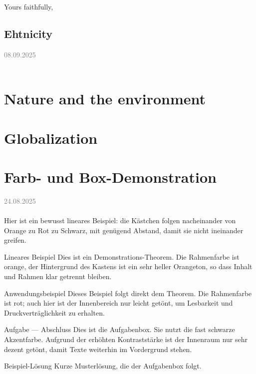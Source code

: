 \documentclass[11pt,a4paper,oneside]{article}
\newcommand{\lessondate}[1]{
	\noindent\hfill\textcolor{gray}{\textsc{#1}} \\
	\vspace{0.5cm}
}
\begin{document}
	Yours faithfully,
	\newpage
	
	\subsection{Ehtnicity}
	\lessondate{08.09.2025}\\
	
	
	\section{Nature and the environment}
	\section{Globalization}
	
	
	\newpage
	
	
	\section{Farb- und Box-Demonstration}

	
	\lessondate{24.08.2025}\\
	Hier ist ein bewusst lineares Beispiel: die Kästchen folgen nacheinander von Orange zu Rot zu Schwarz, mit genügend Abstand, damit sie nicht ineinander greifen.
	
	\begin{theorem}{Lineares Beispiel}
		Dies ist ein Demonstrations-Theorem. Die Rahmenfarbe ist orange, der Hintergrund des Kastens ist ein sehr heller Orangeton, so dass Inhalt und Rahmen klar getrennt bleiben.
	\end{theorem}
	
	\begin{example}{Anwendungsbeispiel}
		Dieses Beispiel folgt direkt dem Theorem. Die Rahmenfarbe ist rot; auch hier ist der Innenbereich nur leicht getönt, um Lesbarkeit und Druckverträglichkeit zu erhalten.
	\end{example}
	
	\begin{task}{Aufgabe — Abschluss}
		Dies ist die Aufgabenbox. Sie nutzt die fast schwarze Akzentfarbe. Aufgrund der erhöhten Kontraststärke ist der Innenraum nur sehr dezent getönt, damit Texte weiterhin im Vordergrund stehen.
	\end{task}
	
	\begin{solution}{Beispiel-Lösung}
		Kurze Musterlösung, die der Aufgabenbox folgt.
	\end{solution}
	
\end{document}
